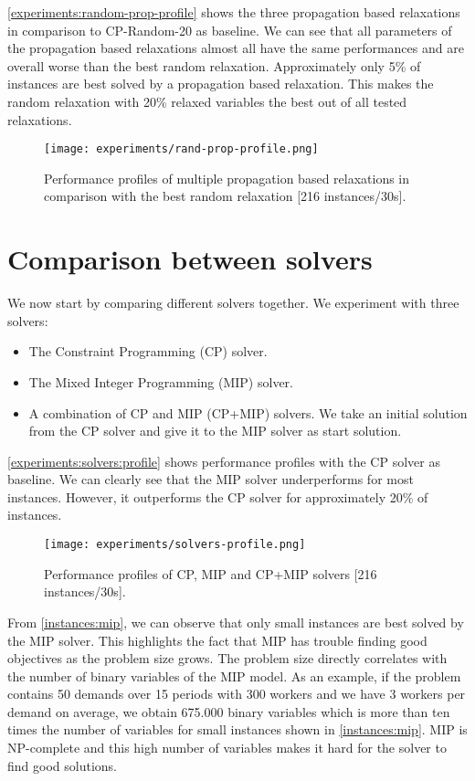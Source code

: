 \documentclass[../../thesis.tex]{subfiles}
\begin{document}
\autoref{experiments:random-prop-profile} shows the three propagation based relaxations in comparison to CP-Random-20 as baseline.
We can see that all parameters of the propagation based relaxations almost all have the same performances and 
are overall worse than the best random relaxation. Approximately only 5\% of instances are best solved by a propagation based 
relaxation. This makes the random relaxation with 20\% relaxed variables the best out of all tested relaxations.

\begin{figure}
  \centering
  \texttt{[image: experiments/rand-prop-profile.png]}
  \caption{Performance profiles of multiple propagation based relaxations in comparison with the best random relaxation [216 instances/30s].}
  \label{experiments:random-prop-profile}
\end{figure}


\section{Comparison between solvers}

We now start by comparing different solvers together. We experiment with three solvers: 

\begin{itemize}
  \item The Constraint Programming (CP) solver.
  \item The Mixed Integer Programming (MIP) solver.
  \item A combination of CP and MIP (CP+MIP) solvers. We take an initial solution from the CP solver 
  and give it to the MIP solver as start solution. 
\end{itemize}



\autoref{experiments:solvers:profile} 
shows performance profiles with the CP solver as baseline. We can clearly see that 
the MIP solver underperforms for most instances. However, it outperforms the CP solver for approximately
20\% of instances. 

\begin{figure}
  \centering
  \texttt{[image: experiments/solvers-profile.png]}
  \caption{Performance profiles of CP, MIP and CP+MIP solvers [216 instances/30s].}
  \label{experiments:solvers:profile}
\end{figure}

From \autoref{instances:mip}, we can observe that only small instances are best solved by the MIP solver. 
This highlights the fact that MIP has trouble finding good objectives as the problem size grows.
The problem size directly correlates with the number of binary variables of the MIP model. As an example,
if the problem contains 50 demands over 15 periods with 300 workers and we have 3 workers per demand on average,
we obtain 675.000 binary variables which is more than ten times the number of variables for small instances shown 
in \autoref{instances:mip}. MIP is NP-complete and this high number of variables makes it hard for the solver to find good solutions.
\end{document}
